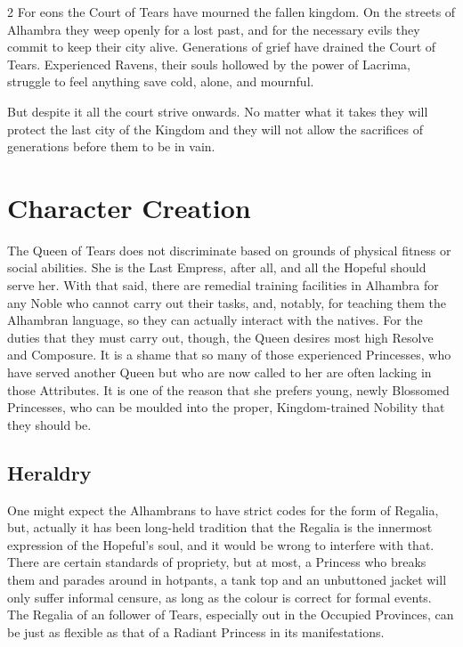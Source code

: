 \begin{multicols}{2}
For eons the Court of Tears have mourned the fallen kingdom. On the streets of Alhambra they weep openly for a lost past, and for the necessary evils they commit to keep their city alive. Generations of grief have drained the Court of Tears. Experienced Ravens, their souls hollowed by the power of Lacrima, struggle to feel anything save cold, alone, and mournful. 

But despite it all the court strive onwards. No matter what it takes they will protect the last city of the Kingdom and they will not allow the sacrifices of generations before them to be in vain. 

\section*{Character Creation}
The Queen of Tears does not discriminate based on grounds of physical fitness or social abilities. She is the Last Empress, after all, and all the Hopeful should serve her. With that said, there are remedial training facilities in Alhambra for any Noble who cannot carry out their tasks, and, notably, for teaching them the Alhambran language, so they can actually interact with the natives. For the duties that they must carry out, though, the Queen desires most high Resolve and Composure. It is a shame that so many of those experienced Princesses, who have served another Queen but who are now called to her are often lacking in those Attributes. It is one of the reason that she prefers young, newly Blossomed Princesses, who can be moulded into the proper, Kingdom-trained Nobility that they should be.
\subsection*{Heraldry}
One might expect the Alhambrans to have strict codes for the form of Regalia, but, actually it has been long-held tradition that the Regalia is the innermost expression of the Hopeful's soul, and it would be wrong to interfere with that. There are certain standards of propriety, but at most, a Princess who breaks them and parades around in hotpants, a tank top and an unbuttoned jacket will only suffer informal censure, as long as the colour is correct for formal events. The Regalia of an follower of Tears, especially out in the Occupied Provinces, can be just as flexible as that of a Radiant Princess in its manifestations. 


\end{multicols}
